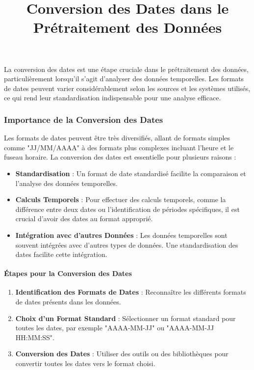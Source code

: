 \documentclass{article}
\title{Conversion des Dates dans le Prétraitement des Données}
\author{}
\date{}
\begin{document}
\maketitle

La conversion des dates est une étape cruciale dans le prétraitement des données, particulièrement lorsqu'il s'agit d'analyser des données temporelles. Les formats de dates peuvent varier considérablement selon les sources et les systèmes utilisés, ce qui rend leur standardisation indispensable pour une analyse efficace.

\subsubsection{Importance de la Conversion des Dates}
Les formats de dates peuvent être très diversifiés, allant de formats simples comme "JJ/MM/AAAA" à des formats plus complexes incluant l'heure et le fuseau horaire. La conversion des dates est essentielle pour plusieurs raisons :

\begin{itemize}
    \item \textbf{Standardisation} : Un format de date standardisé facilite la comparaison et l'analyse des données temporelles.
    \item \textbf{Calculs Temporels} : Pour effectuer des calculs temporels, comme la différence entre deux dates ou l'identification de périodes spécifiques, il est crucial d'avoir des dates au format approprié.
    \item \textbf{Intégration avec d'autres Données} : Les données temporelles sont souvent intégrées avec d'autres types de données. Une standardisation des dates facilite cette intégration.
\end{itemize}

\paragraph*{Étapes pour la Conversion des Dates}
\begin{enumerate}
    \item \textbf{Identification des Formats de Dates} : Reconnaître les différents formats de dates présents dans les données.
    \item \textbf{Choix d'un Format Standard} : Sélectionner un format standard pour toutes les dates, par exemple "AAAA-MM-JJ" ou "AAAA-MM-JJ HH:MM:SS".
    \item \textbf{Conversion des Dates} : Utiliser des outils ou des bibliothèques pour convertir toutes les dates vers le format choisi.
\end{enumerate}
\end{document}
